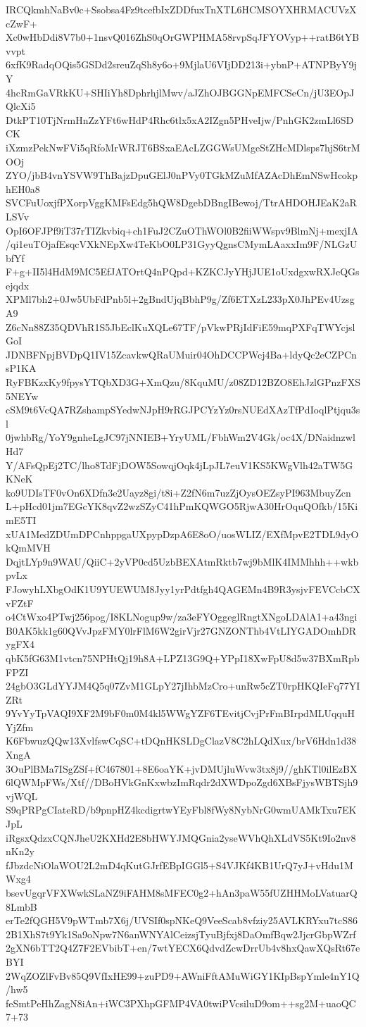 IRCQkmhNaBv0c+Ssobsa4Fz9tcefbIxZDDfuxTnXTL6HCMSOYXHRMACUVzXcZwF+
Xc0wHbDdi8V7b0+1nsvQ016ZhS0qOrGWPHMA58rvpSqJFYOVyp++ratB6tYBvvpt
6xfK9RadqOQis5GSDd2sreuZqSh8y6o+9MjlaU6VIjDD213i+ybnP+ATNPByY9jY
4hcRmGaVRkKU+SHIiYh8DphrhjlMwv/aJZhOJBGGNpEMFCSeCn/jU3EOpJQlcXi5
DtkPT10TjNrmHnZzYFt6wHdP4Rhc6tlx5xA2IZgn5PHveIjw/PnhGK2zmLl6SDCK
iXzmzPekNwFVi5qRfoMrWRJT6BSxaEAcLZGGWsUMgeStZHcMDlsps7hjS6trMOOj
ZYO/jbB4vnYSVW9ThBajzDpuGElJ0nPVy0TGkMZuMfAZAcDhEmNSwHcokphEH0a8
SVCFuUoxjfPXorpVggKMFsEdg5hQW8DgebDBngIBewoj/TtrAHDOHJEaK2aRLSVv
OpI6OFJPf9iT37rTIZkvbiq+ch1FuJ2CZuOThWOl0B2fiiWWspv9BlmNj+mexjIA
/qi1euTOjafEsqcVXkNEpXw4TeKbO0LP31GyyQgnsCMymLAaxxIm9F/NLGzUbfYf
F+g+II5l4HdM9MC5EfJATOrtQ4nPQpd+KZKCJyYHjJUE1oUxdgxwRXJeQGsejqdx
XPMl7bh2+0Jw5UbFdPnb5l+2gBndUjqBbhP9g/Zf6ETXzL233pX0JhPEv4UzsgA9
Z6cNn88Z35QDVhR1S5JbEclKuXQLe67TF/pVkwPRjIdFiE59mqPXFqTWYcjslGoI
JDNBFNpjBVDpQ1IV15ZcavkwQRaUMuir04OhDCCPWcj4Ba+ldyQc2eCZPCnsP1KA
RyFBKzxKy9fpysYTQbXD3G+XmQzu/8KquMU/z08ZD12BZO8EhJzlGPnzFXS5NEYw
cSM9t6VcQA7RZshampSYedwNJpH9rRGJPCYzYz0rsNUEdXAzTfPdIoqlPtjqu3sl
0jwhbRg/YoY9gnheLgJC97jNNIEB+YryUML/FbhWm2V4Gk/oc4X/DNaidnzwlHd7
Y/AFsQpEj2TC/lho8TdFjDOW5SowqjOqk4jLpJL7euV1KS5KWgVlh42aTW5GKNeK
ko9UDIsTF0vOn6XDfn3e2Uayz8gi/t8i+Z2fN6m7uzZjOysOEZsyPI963MbuyZcn
L+pHcd01jm7EGcYK8qvZ2wzSZyC41hPmKQWGO5RjwA30HrOquQOfkb/15KimE5TI
xUA1MedZDUmDPCnhppgaUXpypDzpA6E8oO/uosWLIZ/EXfMpvE2TDL9dyOkQmMVH
DqjtLYp9n9WAU/QiiC+2yVP0cd5UzbBEXAtmRktb7wj9bMlK4IMMhhh++wkbpvLx
FJowyhLXbgOdK1U9YUEWUM8Jyy1yrPdtfgh4QAGEMn4B9R3ysjvFEVCcbCXvFZtF
o4CtWxo4PTwj256pog/I8KLNogup9w/za3eFYOggeglRngtXNgoLDAlA1+a43ngi
B0AK5kk1g60QVvJpzFMY0lrFlM6W2girVjr27GNZONThb4VtLIYGADOmhDRygFX4
qbK5fG63M1vtcn75NPHtQj19h8A+LPZ13G9Q+YPpI18XwFpU8d5w37BXmRpbFPZI
24gbO3GLdYYJM4Q5q07ZvM1GLpY27jIhbMzCro+unRw5cZT0rpHKQIeFq77YIZRt
9YvYyTpVAQI9XF2M9bF0m0M4kl5WWgYZF6TEvitjCvjPrFmBIrpdMLUqquHYjZfm
K6FbwuzQQw13XvlfswCqSC+tDQnHKSLDgClazV8C2hLQdXux/brV6Hdn1d38XngA
3OuPlBMa7ISgZSf+fC467801+8E6oaYK+jvDMUjluWvw3tx8j9//ghKTl0ilEzBX
6lQWMpFWs/Xtf//DBoHVkGnKxwbzImRqdr2dXWDpoZgd6XBsFjysWBTSjh9vjWQL
S9qPRPgCIateRD/b9pnpHZ4kcdigrtwYEyFbl8fWy8NybNrG0wmUAMkTxu7EKJpL
iRgsxQdzxCQNJheU2KXHd2E8bHWYJMQGnia2yseWVhQhXLdVS5Kt9Io2nv8nKn2y
fJbzdcNiOlaWOU2L2mD4qKutGJrfEBpIGGl5+S4VJKf4KB1UrQ7yJ+vHdu1MWxg4
bsevUgqrVFXWwkSLaNZ9iFAHM8sMFEC0g2+hAn3paW55fUZHHMoLVatuarQ8LmbB
erTe2fQGH5V9pWTmb7X6j/UVSIf0spNKeQ9VeeScab8vfziy25AVLKRYxu7tcS86
2B1XhS7t9Yk1Sa9oNpw7N6anWNYAlCeizsjTyuBjfxj8DaOmfBqw2JjcrGbpWZrf
2gXN6bTT2Q4Z7F2EVbibT+en/7wtYECX6QdvdZcwDrrUb4v8hxQawXQsRt67eBYI
2WqZOZlFvBv85Q9VfIxHE99+zuPD9+AWniFftAMuWiGY1KIpBspYmle4nY1Q/hw5
feSmtPeHhZagN8iAn+iWC3PXhpGFMP4VA0twiPVcsiluD9om++sg2M+uaoQC7+73
